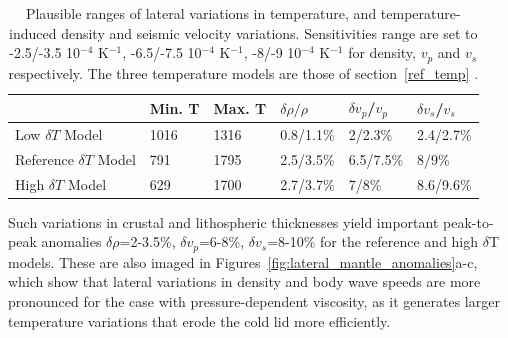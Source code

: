 \begin{table}[h!]
\centering
\caption{Plausible ranges of lateral variations in temperature, and temperature-induced density and seismic velocity variations. Sensitivities range are set to -2.5/-3.5 10$^{-4}$ K$^{-1}$, -6.5/-7.5 10$^{-4}$ K$^{-1}$, -8/-9 10$^{-4}$ K$^{-1}$ for density, $v_p$ and $v_s$ respectively. The three temperature models are those of section~\ref{ref_temp} .}
\begin{tabular}{l|lllll}
                            & Min. T& Max. T & $\delta\rho/\rho$   & $\delta v_p$/$v_p$ & $\delta v_s$/$v_s$        \\ \hline
Low $\delta T$ Model        & 1016  & 1316   & 0.8/1.1\%      & 2/2.3\%       & 2.4/2.7\% \\
Reference $\delta T$ Model  & 791   & 1795   & 2.5/3.5\%      & 6.5/7.5\%     & 8/9\%     \\
High $\delta T$ Model       & 629   & 1700   & 2.7/3.7\%      & 7/8\%         & 8.6/9.6\%
\end{tabular}
\label{table:T_induced_variations}

\end{table}

Such variations in crustal and lithospheric thicknesses yield important peak-to-peak anomalies $\delta \rho$=2-3.5\%, $\delta  v_p$=6-8\%, $\delta  v_s$=8-10\% for the reference and high $\delta$T models.  These are also imaged in Figures~\ref{fig:lateral_mantle_anomalies}a-c, which show that lateral variations in density and body wave speeds are more pronounced for the case with pressure-dependent viscosity, as it generates larger temperature variations that erode the cold lid more efficiently.

